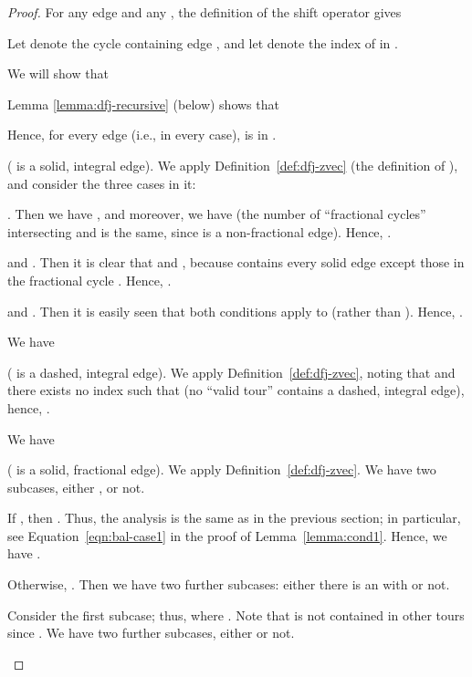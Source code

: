 \documentclass[11pt]{article}
\begin{document}
\begin{proof}
For any edge  and any ,
the definition of the shift operator gives


Let  denote the cycle containing edge ,
and let  denote the index of  in .

We will show that

Lemma \ref{lemma:dfj-recursive} (below) shows that

Hence, for every edge  (i.e., in every case),  is in .
\begin{description}{
\item[Case~1.]

{( is a solid, integral edge)}.
We apply Definition~\ref{def:dfj-zvec} (the definition of ), and
consider the three cases in it:
\\
\begin{description}{
\item[Subcase~1.1.]
.
Then we have , and moreover,
we have 
(the number of ``fractional cycles'' intersecting  and 
is the same, since  is a non-fractional edge).
Hence, .
\\
\item[Subcase~1.2.]
 and
.
Then it is clear that  and ,
because  contains every solid edge except those in
the fractional cycle .
Hence, .
\\
\item[Subase~1.3.]
 and
.
Then it is easily seen that both conditions apply to  (rather than ).
Hence, .
}\end{description}

\item[Case~2.]
We have

{( is a dashed, integral edge)}.
We apply Definition~\ref{def:dfj-zvec}, noting that
 and
there exists no index  such that 
(no ``valid tour'' contains a dashed, integral edge),
hence, .

\item[Case~3.]
We have

{( is a solid, fractional edge)}.
We apply Definition~\ref{def:dfj-zvec}.
We have two subcases, either
, or not.
\\
\begin{description}{
\item[Subcase~3.1.]
If , then .
Thus, the analysis is the same as in the previous section; in particular,
see Equation~\eqref{eqn:bal-case1} in the proof of Lemma~\ref{lemma:cond1}.
Hence, we have
.

\item[Subcase~3.2.]
Otherwise, .
Then we have two further subcases:
either there is an  with 
or not.
\\
\begin{description}{
\item[Subcase~3.2.1]
Consider the first subcase;
thus,  where .
Note that  is not contained
in other tours since .
We have two further subcases, either  or not.

}
\end{description}}
\end{description}}
\end{description}
\end{proof}
\end{document}

